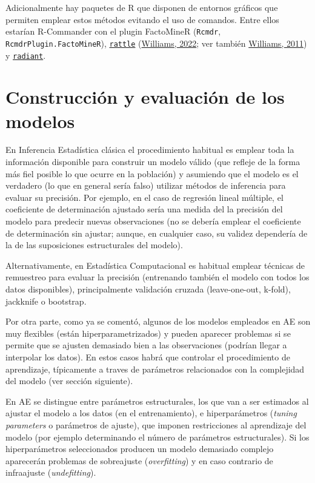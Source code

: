 \documentclass[
]{book}
\theoremstyle{break}
\theoremstyle{nonumberplain}
\begin{document}
Adicionalmente hay paquetes de R que disponen de entornos gráficos que permiten emplear estos métodos evitando el uso de comandos.
Entre ellos estarían R-Commander con el plugin FactoMineR (\texttt{Rcmdr}, \texttt{RcmdrPlugin.FactoMineR}), \href{https://rattle.togaware.com}{\texttt{rattle}} (\protect\hyperlink{ref-R-rattle}{Williams, 2022}; ver también \protect\hyperlink{ref-williams2011data}{Williams, 2011}) y \href{https://github.com/radiant-rstats/radiant}{\texttt{radiant}}.

\hypertarget{const-eval}{%
\section{Construcción y evaluación de los modelos}\label{const-eval}}

En Inferencia Estadística clásica el procedimiento habitual es emplear toda la información disponible para construir un modelo válido (que refleje de la forma más fiel posible lo que ocurre en la población) y asumiendo que el modelo es el verdadero (lo que en general sería falso) utilizar métodos de inferencia para evaluar su precisión.
Por ejemplo, en el caso de regresión lineal múltiple, el coeficiente de determinación ajustado sería una medida del la precisión del modelo para predecir nuevas observaciones (no se debería emplear el coeficiente de determinación sin ajustar; aunque, en cualquier caso, su validez dependería de la de las suposiciones estructurales del modelo).

Alternativamente, en Estadística Computacional es habitual emplear técnicas de remuestreo para evaluar la precisión (entrenando también el modelo con todos los datos disponibles), principalmente validación cruzada (leave-one-out, k-fold), jackknife o bootstrap.

Por otra parte, como ya se comentó, algunos de los modelos empleados en AE son muy flexibles (están hiperparametrizados) y pueden aparecer problemas si se permite que se ajusten demasiado bien a las observaciones (podrían llegar a interpolar los datos).
En estos casos habrá que controlar el procedimiento de aprendizaje, típicamente a traves de parámetros relacionados con la complejidad del modelo (ver sección siguiente).

En AE se distingue entre parámetros estructurales, los que van a ser estimados al ajustar el modelo a los datos (en el entrenamiento), e hiperparámetros (\emph{tuning parameters} o parámetros de ajuste), que imponen restricciones al aprendizaje del modelo (por ejemplo determinando el número de parámetros estructurales).
Si los hiperparámetros seleccionados producen un modelo demasiado complejo aparecerán problemas de sobreajuste (\emph{overfitting}) y en caso contrario de infraajuste (\emph{undefitting}).
\end{document}
